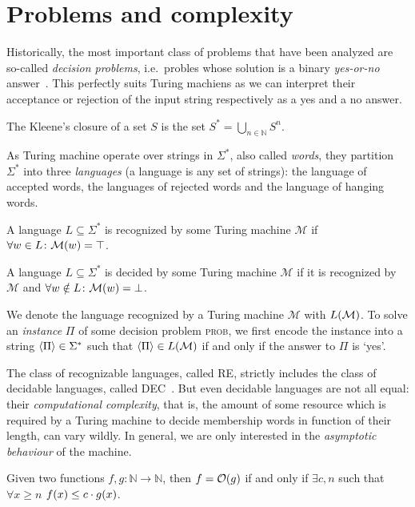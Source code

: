 \section{Problems and complexity}
Historically, the most important class of problems that have been analyzed are so-called
\emph{decision problems}, i.e.\ probles whose solution is a binary \emph{yes-or-no} 
answer~\cite{Sipser2013}.
This perfectly suits Turing machiens as we can interpret their acceptance or rejection of the input 
string respectively as a yes and a no answer.

\begin{definition}
  The Kleene's closure of a set \(S\) is the set \(S^* = \bigcup_{n \in \mathbb{N}}{S^n}\).
\end{definition}

As Turing machine operate over strings in \(\Sigma^*\), also called \emph{words}, they partition 
\(\Sigma^* \) into three \emph{languages} (a language is any set of strings): the language of 
accepted words, the languages of rejected words and the language of hanging words.
\begin{definition}
  A language \(L \subseteq \Sigma^*\) is recognized by some Turing machine \(\mathcal{M}\) if 
  \(\forall w \in L\colon \call{\mathcal{M}}{w} = \top \).
\end{definition}
\begin{definition}
  A language \(L \subseteq \Sigma^*\) is decided by some Turing machine \(\mathcal{M}\) if it is 
  recognized by \(\mathcal{M}\) and \(\forall w \notin L\colon \call{\mathcal{M}}{w} = \bot \).
\end{definition}

We denote the language recognized by a Turing machine \(\mathcal{M}\) with \(\call{L}{\mathcal{M}}\).
To solve an \emph{instance} \(\Pi \) of some decision problem \textsc{prob}, we first encode the 
instance into a string \(\left\langle\Pi\right\rangle \in \Sigma^*\) such that 
\(\Encode{\Pi} \in \call{L}{\mathcal{M}}\) if and only if the answer to \(\Pi \) is `yes'.

The class of recognizable languages, called \textsc{RE}, strictly includes the class of decidable 
languages, called \textsc{DEC}~\cite{Turing1937}.
But even decidable languages are not all equal: their \emph{computational complexity}, that is,
the amount of some resource which is required by a Turing machine to decide membership words in 
function of their length, can vary wildly.
In general, we are only interested in the \emph{asymptotic behaviour} of the machine.
\begin{definition}
  Given two functions \(f, g\colon \mathbb{N} \to \mathbb{N}\), then \(f = \BigO{g}\) if 
  and only if \(\exists c,n\) such that \(\forall x \ge n\) \(\call{f}{x} \le c \cdot \call{g}{x}\).
\end{definition}

